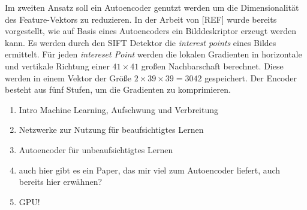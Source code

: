 Im zweiten Ansatz soll ein Autoencoder genutzt werden um die Dimensionalität des Feature-Vektors zu reduzieren. In der Arbeit von [REF] wurde bereits vorgestellt, wie auf Basis eines Autoencoders ein Bilddeskriptor erzeugt werden kann. Es werden durch den SIFT Detektor die \textit{interest points} eines Bildes ermittelt. Für jeden \textit{intereset Point} werden die lokalen Gradienten in horizontale und vertikale Richtung einer $41 \times 41$ großen Nachbarschaft berechnet. Diese werden in einem Vektor der Größe $2 \times 39 \times 39 = 3042$ gespeichert. Der Encoder besteht aus fünf Stufen, um die Gradienten zu komprimieren.

\begin{enumerate}
	\item Intro Machine Learning, Aufschwung und Verbreitung 
	\item Netzwerke zur Nutzung für beaufsichtigtes Lernen
	\item Autoencoder für unbeaufsichtigtes Lernen
	\item auch hier gibt es ein Paper, das mir viel zum Autoencoder liefert, auch bereits hier erwähnen?
	\item GPU!
\end{enumerate}